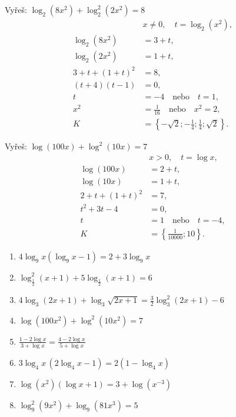 \documentclass[11pt,a4paper]{article}
\begin{document}
\begin{prikladReseniBox}[title={Příklad 3}]
Vyřeš: $\displaystyle \log_2(8x^2)+\log_2^2(2x^2)=8$
\tcblower
\[
\begin{aligned}
&x\ne0,\quad t=\log_2(x^2),\\
\log_2(8x^2)&=3+t,\\
\log_2(2x^2)&=1+t,\\
3+t+(1+t)^2&=8,\\
(t+4)(t-1)&=0,\\
t&=-4\quad\text{nebo}\quad t=1,\\
x^2&=\frac1{16}\quad\text{nebo}\quad x^2=2,\\
K&=\left\{-\sqrt2;-\frac14;\frac14;\sqrt2\right\}.
\end{aligned}
\]
\end{prikladReseniBox}
\begin{prikladReseniBox}[title={Příklad 4}]
Vyřeš: $\displaystyle \log(100x)+\log^2(10x)=7$
\tcblower
\[
\begin{aligned}
&x>0,\quad t=\log x,\\
\log(100x)&=2+t,\\
\log(10x)&=1+t,\\
2+t+(1+t)^2&=7,\\
t^2+3t-4&=0,\\
t&=1\quad\text{nebo}\quad t=-4,\\
K&=\left\{\frac1{10000};10\right\}.
\end{aligned}
\]
\end{prikladReseniBox}
\begin{zadaniBox}[title={Samostatná práce 1}]
\begin{enumerate}[label=\alph*)]
\item $\displaystyle 4\log_9 x(\log_9 x-1)=2+3\log_9 x$
\item $\displaystyle \log_{\frac12}^2(x+1)+5\log_{\frac12}(x+1)=6$
\item $\displaystyle 4\log_3(2x+1)+\log_3\sqrt{2x+1}=\frac32\log_3^2(2x+1)-6$
\item $\displaystyle \log(100x^2)+\log^2(10x^2)=7$
\item $\displaystyle \frac{1-2\log x}{3+\log x}=\frac{4-2\log x}{5+\log x}$
\item $\displaystyle 3\log_4x\,(2\log_4x-1)=2(1-\log_4x)$
\item $\displaystyle \log(x^2)(\log x+1)=3+\log(x^{-3})$
\item $\displaystyle \log_9^2(9x^2)+\log_9(81x^3)=5$
\end{enumerate}
\end{zadaniBox}
\end{document}
